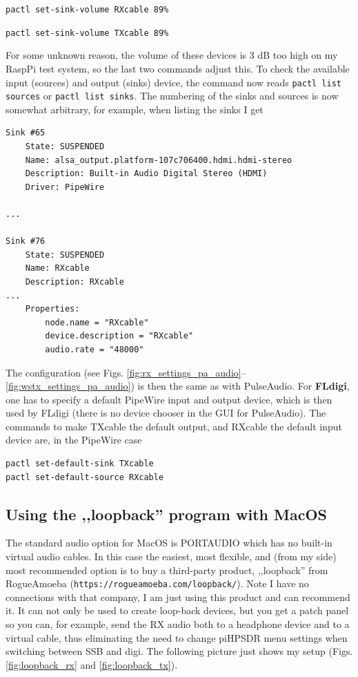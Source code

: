 \documentclass[12pt]{book}
\def\pH{pi\-HPSDR\xspace}
\begin{document}
\texttt{pactl set-sink-volume RXcable 89\%}

\texttt{pactl set-sink-volume TXcable 89\%}

For some unknown reason, the volume of these devices is 3 dB too high on my
RaspPi test system, so the last two commands adjust this.
To check the available input (sources) and output (sinks) device, the command
now reads \texttt{pactl list sources} or \texttt{pactl list sinks}. The numbering
of the sinks and sources is now somewhat arbitrary, for example, when listing the
sinks I get
\begin{verbatim}
Sink #65
	State: SUSPENDED
	Name: alsa_output.platform-107c706400.hdmi.hdmi-stereo
	Description: Built-in Audio Digital Stereo (HDMI)
	Driver: PipeWire

...

Sink #76
	State: SUSPENDED
	Name: RXcable
	Description: RXcable
...
	Properties:
		node.name = "RXcable"
		device.description = "RXcable"
		audio.rate = "48000"
\end{verbatim}
The configuration (see Figs. \ref{fig:rx_settings_pa_audio}--\ref{fig:wstx_settings_pa_audio}) is then the same
as with PulseAudio. For {\color{red} \textbf{FLdigi}}, one has to specify a default PipeWire input and output device, which is
then used by FLdigi (there is no device chooser in the GUI for PulseAudio). The commands to make TXcable the default output, and RXcable the default
input device are, in the PipeWire case

\begin{verbatim}
pactl set-default-sink TXcable
pactl set-default-source RXcable
\end{verbatim}

\subsection[MacOS: LoopBack]{Using the ,,loopback'' program with MacOS}
The standard audio option for MacOS is PORTAUDIO which has no built-in virtual
audio cables. In this case
the easiest, most flexible, and (from my side) most recommended option is
to buy a third-party product,  ,,loopback'' from RogueAmoeba
(\texttt{https://rogueamoeba.com/loopback/}).
Note I have no connections with that company, I am just using this product and
can recommend it. It can not only be used to create loop-back devices, but you get
a patch panel so you can, for example, send the RX audio both to a headphone device
and to a virtual cable, thus eliminating the need to change \pH menu settings
when switching between SSB and digi. The following picture just shows my setup
(Figs. \ref{fig:loopback_rx} and \ref{fig:loopback_tx}).
\end{document}
